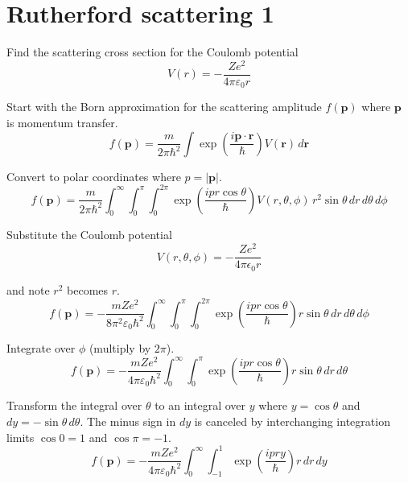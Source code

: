 


\section*{Rutherford scattering 1}

Find the scattering cross section for the Coulomb potential
\begin{equation*}
V(r)=-\frac{Ze^2}{4\pi\varepsilon_0r}
\end{equation*}

Start with the Born approximation for the scattering amplitude
$f(\mathbf p)$ where $\mathbf p$ is momentum transfer.
\begin{equation*}
f(\mathbf p)
=\frac{m}{2\pi\hbar^2}
\int\exp\left(\frac{i\mathbf p\cdot\mathbf r}{\hbar}\right)V(\mathbf r)\,d\mathbf r
\end{equation*}

Convert to polar coordinates where $p=|\mathbf p|$.
\begin{equation*}
f(\mathbf p)
=\frac{m}{2\pi\hbar^2}
\int_0^\infty
\int_0^\pi
\int_0^{2\pi}
\exp\left(\frac{ipr\cos\theta}{\hbar}\right)V(r,\theta,\phi)
\,r^2\sin\theta\,dr\,d\theta\,d\phi
\end{equation*}

Substitute the Coulomb potential
\begin{equation*}
V(r,\theta,\phi)=-\frac{Ze^2}{4\pi\epsilon_0r}
\end{equation*}

and note $r^2$ becomes $r$.
\begin{equation*}
f(\mathbf p)
=-\frac{mZe^2}{8\pi^2\varepsilon_0\hbar^2}
\int_0^\infty
\int_0^\pi
\int_0^{2\pi}
\exp\left(\frac{ipr\cos\theta}{\hbar}\right)
r\sin\theta\,dr\,d\theta\,d\phi
\end{equation*}

Integrate over $\phi$ (multiply by $2\pi$).
\begin{equation*}
f(\mathbf p)
=-\frac{mZe^2}{4\pi\varepsilon_0\hbar^2}
\int_0^\infty
\int_0^\pi
\exp\left(\frac{ipr\cos\theta}{\hbar}\right)
r\sin\theta\,dr\,d\theta
\end{equation*}

Transform the integral over $\theta$ to an integral over $y$
where $y=\cos\theta$ and $dy=-\sin\theta\,d\theta$.
The minus sign in $dy$ is canceled by interchanging integration limits
$\cos0=1$ and $\cos\pi=-1$.
\begin{equation*}
f(\mathbf p)
=-\frac{mZe^2}{4\pi\varepsilon_0\hbar^2}
\int_0^\infty
\int_{-1}^1
\exp\left(\frac{ipry}{\hbar}\right)
r\,dr\,dy
\end{equation*}

